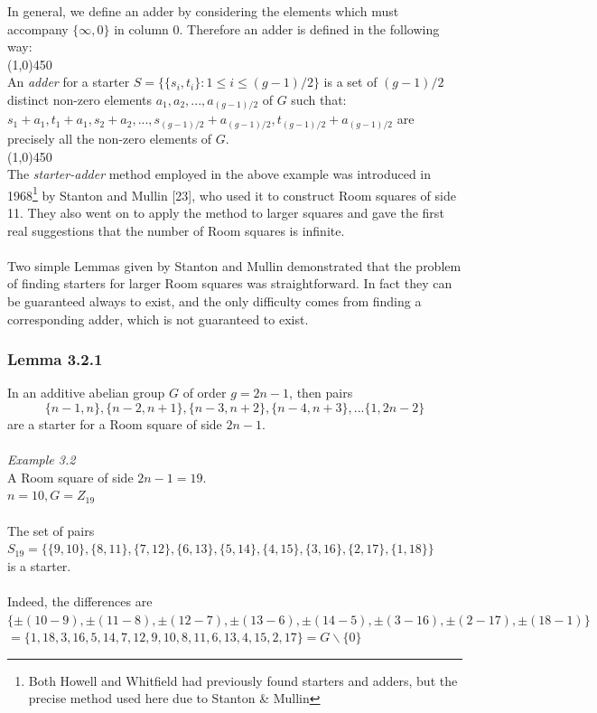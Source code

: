 \documentclass[
  12pt,
  a4paper]{book}
\begin{document}
In general, we define an adder by considering the elements which must
accompany \(\{\infty,0\}\) in column 0. Therefore an adder is defined in
the following way:\\
(1,0){450}\\
An \emph{adder} for a starter \(S=\{\{s_i,t_i\}: 1 \leq i \leq (g-1)/2 \}\) is
a set of \((g-1)/2\) distinct non-zero elements \(a_1,a_2,...,a_{(g-1)/2}\)
of \(G\) such that:
\(s_1 + a_1,t_1 + a_1,s_2 + a_2,...,s_{(g-1)/2} + a_{(g-1)/2}, t_{(g-1)/2}+a_{(g-1)/2}\)
are precisely all the non-zero elements of \(G\).\\
(1,0){450}\\
The \emph{starter-adder} method employed in the above example was introduced
in 1968\footnote{Both Howell and Whitfield had previously found starters and
  adders, but the precise method used here due to Stanton \& Mullin} by Stanton and Mullin {[}23{]}, who used it to construct Room
squares of side 11. They also went on to apply the method to larger
squares and gave the first real suggestions that the number of Room
squares is infinite.\\
~\\
Two simple Lemmas given by Stanton and Mullin demonstrated that the
problem of finding starters for larger Room squares was straightforward.
In fact they can be guaranteed always to exist, and the only difficulty
comes from finding a corresponding adder, which is not guaranteed to
exist.

\hypertarget{lemma-3.2.1}{%
\subsubsection{Lemma 3.2.1}\label{lemma-3.2.1}}

In an additive abelian group \(G\) of order \(g=2n-1\), then pairs
\[\{n-1,n\},\{n-2,n+1\},\{n-3,n+2\},\{n-4,n+3\},...\{1,2n-2\}\] are a
starter for a Room square of side \(2n-1\).\\
~\\
\emph{Example 3.2}\\
A Room square of side \(2n-1=19\).\\
\(n=10, G=Z_{19}\)\\
~\\
The set of pairs\\
\(S_{19} = \{\{9,10\},\{8,11\}, \{7,12\}, \{6,13\}, \{5,14\}, \{4,15\}, \{3,16\}, \{2,17\}, \{1,18\}\}\)\\
is a starter.\\
~\\
Indeed, the differences are\\
\(\{\pm(10-9),\pm(11-8),\pm(12-7),\pm(13-6),\pm(14-5),\pm(3-16),\pm(2-17),\pm(18-1)\}\)\\
\(=\{1,18,3,16,5,14,7,12,9,10,8,11,6,13,4,15,2,17\}=G \backslash \{0\}\)
\end{document}
